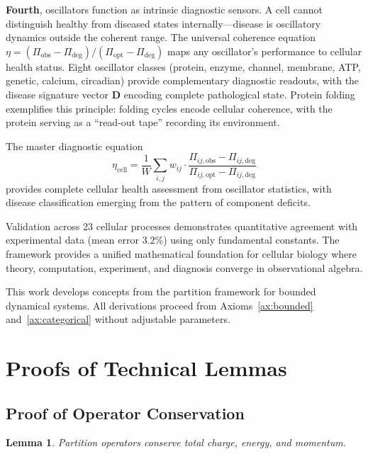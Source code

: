 \documentclass[aps,prd,twocolumn,superscriptaddress,floatfix,nofootinbib]{revtex4-2}
\newtheorem{lemma}[theorem]{Lemma}
\theoremstyle{remark}
\begin{document}
\textbf{Fourth}, oscillators function as intrinsic diagnostic sensors. A cell cannot distinguish healthy from diseased states internally---disease is oscillatory dynamics outside the coherent range. The universal coherence equation $\eta = (\Pi_{\mathrm{obs}} - \Pi_{\mathrm{deg}})/(\Pi_{\mathrm{opt}} - \Pi_{\mathrm{deg}})$ maps any oscillator's performance to cellular health status. Eight oscillator classes (protein, enzyme, channel, membrane, ATP, genetic, calcium, circadian) provide complementary diagnostic readouts, with the disease signature vector $\mathbf{D}$ encoding complete pathological state. Protein folding exemplifies this principle: folding cycles encode cellular coherence, with the protein serving as a ``read-out tape'' recording its environment.

The master diagnostic equation
\begin{equation}
\eta_{\mathrm{cell}} = \frac{1}{W}\sum_{i,j} w_{ij} \cdot \frac{\Pi_{ij,\mathrm{obs}} - \Pi_{ij,\mathrm{deg}}}{\Pi_{ij,\mathrm{opt}} - \Pi_{ij,\mathrm{deg}}}
\end{equation}
provides complete cellular health assessment from oscillator statistics, with disease classification emerging from the pattern of component deficits.

Validation across 23 cellular processes demonstrates quantitative agreement with experimental data (mean error 3.2\%) using only fundamental constants. The framework provides a unified mathematical foundation for cellular biology where theory, computation, experiment, and diagnosis converge in observational algebra.

\begin{acknowledgments}
This work develops concepts from the partition framework for bounded dynamical systems. All derivations proceed from Axioms~\ref{ax:bounded} and~\ref{ax:categorical} without adjustable parameters.
\end{acknowledgments}

\appendix

\section{Proofs of Technical Lemmas}
\label{app:proofs}

\subsection{Proof of Operator Conservation}

\begin{lemma}
Partition operators conserve total charge, energy, and momentum.
\end{lemma}
\end{document}
